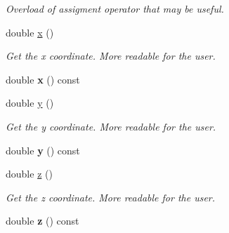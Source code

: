 \begin{DoxyCompactItemize}
\begin{DoxyCompactList}\small\item\em Overload of assigment operator that may be useful. \item\end{DoxyCompactList}\item 
\hypertarget{classpoint3D_ad0e10611be2576222c7ee976e27d9c85}{
double \hyperlink{classpoint3D_ad0e10611be2576222c7ee976e27d9c85}{x} ()}
\label{classpoint3D_ad0e10611be2576222c7ee976e27d9c85}

\begin{DoxyCompactList}\small\item\em Get the x coordinate. More readable for the user. \item\end{DoxyCompactList}\item 
\hypertarget{classpoint3D_a39a0ff739e58f1987b1a261de60078e1}{
double {\bfseries x} () const }
\label{classpoint3D_a39a0ff739e58f1987b1a261de60078e1}

\item 
\hypertarget{classpoint3D_acaaa7fab79bb661f4305affccd9837fb}{
double \hyperlink{classpoint3D_acaaa7fab79bb661f4305affccd9837fb}{y} ()}
\label{classpoint3D_acaaa7fab79bb661f4305affccd9837fb}

\begin{DoxyCompactList}\small\item\em Get the y coordinate. More readable for the user. \item\end{DoxyCompactList}\item 
\hypertarget{classpoint3D_aa06fc03003646b53adc59994e3b25d33}{
double {\bfseries y} () const }
\label{classpoint3D_aa06fc03003646b53adc59994e3b25d33}

\item 
\hypertarget{classpoint3D_a1a9c6ab358848ee59f0f8dd53421a2c4}{
double \hyperlink{classpoint3D_a1a9c6ab358848ee59f0f8dd53421a2c4}{z} ()}
\label{classpoint3D_a1a9c6ab358848ee59f0f8dd53421a2c4}

\begin{DoxyCompactList}\small\item\em Get the z coordinate. More readable for the user. \item\end{DoxyCompactList}\item 
\hypertarget{classpoint3D_a038ac614fb54af4b6c9ec2737c5629a7}{
double {\bfseries z} () const }
\label{classpoint3D_a038ac614fb54af4b6c9ec2737c5629a7}


\end{DoxyCompactItemize}

